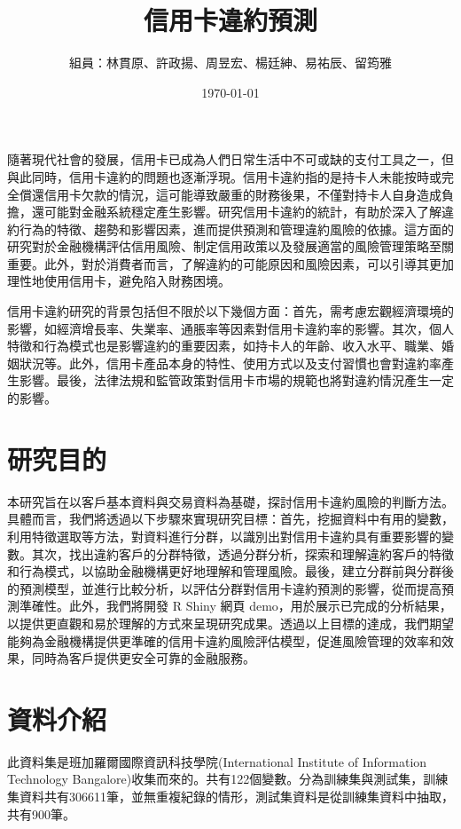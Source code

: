 \documentclass[12pt, a4paper]{article}
\title{ \SM 信用卡違約預測}	%
\author{{\SM 組員：林貫原、許政揚、周昱宏、楊廷紳、易祐辰、留筠雅}}				%
\date{{\R \today }}
\begin{document}
\renewcommand{\tablename}{表}	
\renewcommand{\figurename}{圖}
\maketitle
\fontsize{12}{22pt}\selectfont 

隨著現代社會的發展，信用卡已成為人們日常生活中不可或缺的支付工具之一，但與此同時，信用卡違約的問題也逐漸浮現。信用卡違約指的是持卡人未能按時或完全償還信用卡欠款的情況，這可能導致嚴重的財務後果，不僅對持卡人自身造成負擔，還可能對金融系統穩定產生影響。研究信用卡違約的統計，有助於深入了解違約行為的特徵、趨勢和影響因素，進而提供預測和管理違約風險的依據。這方面的研究對於金融機構評估信用風險、制定信用政策以及發展適當的風險管理策略至關重要。此外，對於消費者而言，了解違約的可能原因和風險因素，可以引導其更加理性地使用信用卡，避免陷入財務困境。

信用卡違約研究的背景包括但不限於以下幾個方面：首先，需考慮宏觀經濟環境的影響，如經濟增長率、失業率、通脹率等因素對信用卡違約率的影響。其次，個人特徵和行為模式也是影響違約的重要因素，如持卡人的年齡、收入水平、職業、婚姻狀況等。此外，信用卡產品本身的特性、使用方式以及支付習慣也會對違約率產生影響。最後，法律法規和監管政策對信用卡市場的規範也將對違約情況產生一定的影響。

\section{研究目的}

本研究旨在以客戶基本資料與交易資料為基礎，探討信用卡違約風險的判斷方法。具體而言，我們將透過以下步驟來實現研究目標：首先，挖掘資料中有用的變數，利用特徵選取等方法，對資料進行分群，以識別出對信用卡違約具有重要影響的變數。其次，找出違約客戶的分群特徵，透過分群分析，探索和理解違約客戶的特徵和行為模式，以協助金融機構更好地理解和管理風險。最後，建立分群前與分群後的預測模型，並進行比較分析，以評估分群對信用卡違約預測的影響，從而提高預測準確性。此外，我們將開發 R Shiny 網頁 demo，用於展示已完成的分析結果，以提供更直觀和易於理解的方式來呈現研究成果。透過以上目標的達成，我們期望能夠為金融機構提供更準確的信用卡違約風險評估模型，促進風險管理的效率和效果，同時為客戶提供更安全可靠的金融服務。

\section{資料介紹}

此資料集是班加羅爾國際資訊科技學院(International Institute of Information Technology Bangalore)收集而來的。共有122個變數。分為訓練集與測試集，訓練集資料共有306611筆，並無重複紀錄的情形，測試集資料是從訓練集資料中抽取，共有900筆。
\end{document}
